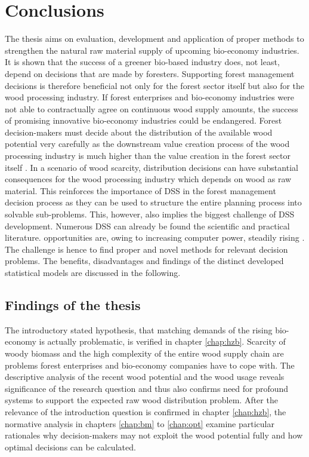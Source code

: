 \chapter{Conclusions}
\label{chap:discussion}
\newpage
\noindent
The thesis aims on evaluation, development and application of proper methods to strengthen the natural raw material supply of upcoming bio-economy industries. It is shown that the success of a greener bio-based industry does, not least, depend on decisions that are made by foresters. Supporting forest management decisions is therefore beneficial not only for the forest sector itself but also for the wood processing industry. If forest enterprises and bio-economy industries were not able to contractually agree on continuous wood supply amounts, the success of promising innovative bio-economy industries could be endangered. Forest decision-makers must decide about the distribution of the available wood potential very carefully as the downstream value creation process of the wood processing industry is much higher than the value creation in the forest sector itself \citep[p. 221,223]{elchichakli_2016}. In a scenario of wood scarcity, distribution decisions can have substantial consequences for the wood processing industry which depends on wood as raw material. This reinforces the importance of DSS in the forest management decision process as they can be used to structure the entire planning process into solvable sub-problems. This, however, also implies the biggest challenge of DSS development. Numerous DSS can already be found the scientific and practical literature. opportunities are, owing to increasing computer power, steadily rising \citep[p. 1065-1067]{pretzsch_2008}. The challenge is hence to find proper and novel methods for relevant decision problems. The benefits, disadvantages and findings of the distinct developed statistical models are discussed in the following.

\section{Findings of the thesis}
\label{sec:discussion:findings}
The introductory stated hypothesis, that matching demands of the rising bio-economy is actually problematic, is verified in chapter \ref{chap:hzb}. Scarcity of woody biomass and the high complexity of the entire wood supply chain are problems forest enterprises and bio-economy companies have to cope with. The descriptive analysis of the recent wood potential and the wood usage reveals significance of the research question and thus also confirms need for profound systems to support the expected raw wood distribution problem. After the relevance of the introduction question is confirmed in chapter \ref{chap:hzb}, the normative analysis in chapters \ref{chap:bm} to \ref{chap:opt} examine particular rationales why decision-makers may not exploit the wood potential fully and how optimal decisions can be calculated.


